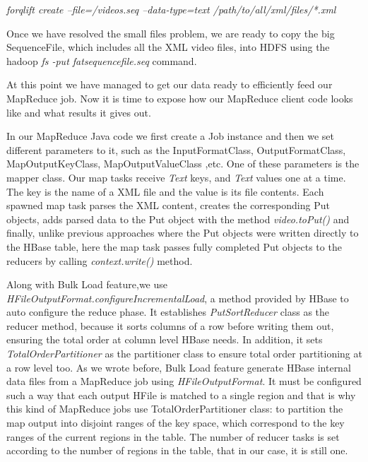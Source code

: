 \centerline{\textit{forqlift create --file=/videos.seq --data-type=text /path/to/all/xml/files/*.xml} }
\bigskip

Once we have resolved the small files problem, we are ready to copy the big SequenceFile, which includes all the XML video files, into HDFS using the hadoop \textit{fs -put fatsequencefile.seq} command. 
\par
At this point we have managed to get our data ready to efficiently feed our MapReduce job. Now  it is time to expose how our MapReduce client code looks like and what results it gives out.
\par


\bigskip

In our MapReduce Java code we first create a Job instance and then we set different parameters to it, such as the InputFormatClass, OutputFormatClass, MapOutputKeyClass, MapOutputValueClass ,etc. One of these parameters is the mapper class. Our map tasks receive \textit{Text} keys, and \textit{Text} values one at a time. The key is the name of a XML file and the value is its file contents. Each spawned map task parses the XML content, creates the corresponding Put objects, adds parsed data to the Put object with the method \textit{video.toPut()} and finally, unlike previous approaches where the Put objects were written directly to the HBase table, here the map task passes fully completed Put objects to the reducers by calling \textit{context.write()} method.
\par
Along with Bulk Load feature,we use \textit{HFileOutputFormat.configureIncrementalLoad}, a method provided by HBase to auto configure the reduce phase. It establishes \textit{PutSortReducer} class as the reducer method, because it sorts columns of a row before writing them out, ensuring the total order at column level HBase needs. In addition, it sets \textit{TotalOrderPartitioner} as the partitioner class to ensure total order partitioning at a row level too. As we wrote before, Bulk Load feature generate HBase internal data files from a MapReduce job using \textit{HFileOutputFormat}. It must be configured such a way that each output HFile is matched to a single region and that is why this kind of MapReduce jobs use TotalOrderPartitioner class: to partition the map output into disjoint ranges of the key space, which correspond to the key ranges of the current regions in the table. The number of reducer tasks is set according to the number of regions in the table, that in our case, it is still one.

